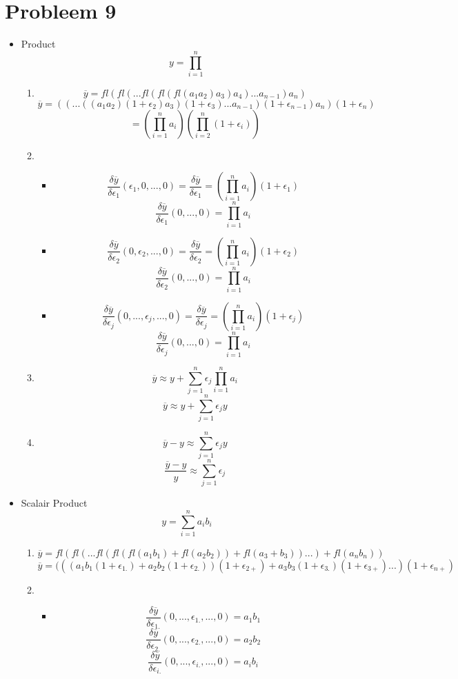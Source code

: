 \documentclass[12pt,a4paper]{article}
\begin{document}
\section{Probleem 9}
\begin{itemize}
\item Product\\
\[
y = \prod_{i=1}^{n}
\]
\begin{enumerate}
\item
\[
\overline{y} = fl(fl(...fl(fl(fl(a_1 a_2) a_3) a_4)... a_{n-1}) a_{n})
\]
\[
\overline{y} = ((...((a_1 a_2)(1+\epsilon_2) a_3)(1+\epsilon_3)...a_{n-1})(1+\epsilon_{n-1}) a_n)(1+\epsilon_n)
\]
\[
= \left(\prod_{i=1}^{n} a_{i} \right) \left( \prod_{i=2}^n(1+\epsilon_i) \right)
\]
\item
\begin{itemize}
\item
\[
\frac{\delta\overline{y}}{\delta\epsilon_1}(\epsilon_1,0,...,0)
= \frac{\delta\overline{y}}{\delta\epsilon_1}
= \left(\prod_{i=1}^{n} a_{i} \right) (1+\epsilon_1)
\]
\[
\frac{\delta\overline{y}}{\delta\epsilon_1}(0,...,0)
= \prod_{i=1}^{n} a_{i}
\]
\item
\[
\frac{\delta\overline{y}}{\delta\epsilon_2}(0,\epsilon_2,...,0)
= \frac{\delta\overline{y}}{\delta\epsilon_2}
= \left(\prod_{i=1}^{n} a_{i} \right) (1+\epsilon_2)
\]
\[
\frac{\delta\overline{y}}{\delta\epsilon_2}(0,...,0)
= \prod_{i=1}^{n} a_{i}
\]
\item
\[
\frac{\delta\overline{y}}{\delta\epsilon_j}(0,...,\epsilon_j,...,0)
= \frac{\delta\overline{y}}{\delta\epsilon_j}
= \left(\prod_{i=1}^{n} a_{i} \right) (1+\epsilon_j)
\]
\[
\frac{\delta\overline{y}}{\delta\epsilon_j}(0,...,0)
= \prod_{i=1}^{n} a_{i}
\]
\end{itemize}

\item
\[
\overline{y} \approx y
+ \sum_{j=1}^{n} \epsilon_j \prod_{i=1}^{n} a_{i}
\]
\[
\overline{y} \approx y
+ \sum_{j=1}^{n} \epsilon_j y
\]

\item
\[
\overline{y} - y
\approx
\sum_{j=1}^{n} \epsilon_j y
\]
\[
\frac{\overline{y} - y}{y}
\approx
\sum_{j=1}^{n} \epsilon_j
\]

\end{enumerate}

\item Scalair Product\\
\[
y = \sum_{i=1}^{n}a_{i}b_{i}
\]
\begin{enumerate}
\item
\[
\overline{y} = fl(fl(...fl(fl(fl(a_1b_1)+fl(a_2b_2))+fl(a_3+b_3))...)+fl(a_nb_n))
\]
\[
\overline{y} = (((a_1b_1(1+\epsilon_{1.})+a_2b_2(1+\epsilon_{2.}))(1+\epsilon_{2+}) + a_3b_3(1+\epsilon_{3.})(1+\epsilon_{3+})...)(1+\epsilon_{n+})
\]
\item
\begin{itemize}
\item
\[
\frac{\delta\overline{y}}{\delta\epsilon_{1.}}(0,...,\epsilon_{1.},...,0)
= a_1b_1
\]
\[
\frac{\delta\overline{y}}{\delta\epsilon_{2.}}(0,...,\epsilon_{2.},...,0)
= a_2b_2
\]
\[
\frac{\delta\overline{y}}{\delta\epsilon_{i.}}(0,...,\epsilon_{i.},...,0)
= a_ib_i
\]


\end{itemize}
\end{enumerate}
\end{itemize}
\end{document}
